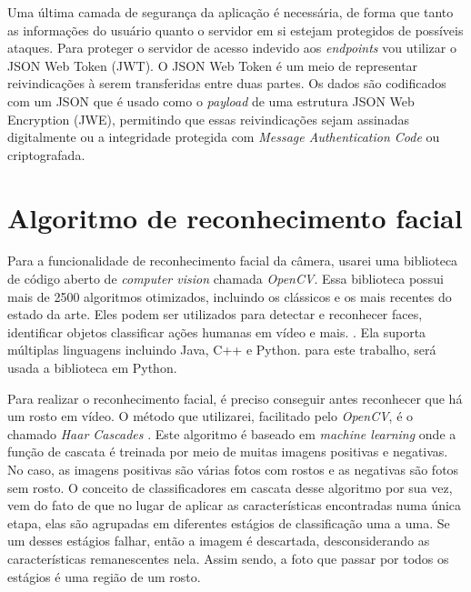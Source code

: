 \documentclass[12pt, %
openright, 
oneside, %
a4paper,    %
brazil]{facom-ufu-abntex2}
\begin{document}
Uma última camada de segurança da aplicação é necessária, de forma que tanto as informações do usuário
quanto o servidor em si estejam protegidos de possíveis ataques. Para proteger o servidor de acesso indevido aos \emph{endpoints}
vou utilizar o JSON Web Token (JWT). O JSON Web Token é um meio de representar reivindicações à serem transferidas entre duas partes.
Os dados são codificados com um JSON que é usado como o \emph{payload} de uma estrutura  JSON Web Encryption (JWE), permitindo que essas
reivindicações sejam assinadas digitalmente ou a integridade protegida com \emph{Message Authentication Code} ou criptografada. \cite{jsonwebtoken}

\section{Algoritmo de reconhecimento facial}

Para a funcionalidade de reconhecimento facial da câmera, usarei uma biblioteca de código aberto
de \emph{computer vision} chamada \emph{OpenCV}. Essa biblioteca possui mais de 2500 algoritmos
otimizados, incluindo os clássicos e os mais recentes do estado da arte. Eles podem ser utilizados
para detectar e reconhecer faces, identificar objetos classificar ações humanas em vídeo e mais. \cite{opencv}.
Ela suporta múltiplas linguagens incluindo Java, C++ e Python. para este trabalho, será usada a biblioteca em Python.

Para realizar o reconhecimento facial, é preciso conseguir antes reconhecer que há um rosto em vídeo.
O método que utilizarei, facilitado pelo \emph{OpenCV}, é o chamado \emph{Haar Cascades} \cite{viola2001rapid}.
Este algoritmo é baseado em \emph{machine learning} onde a função de cascata é treinada por meio de muitas imagens positivas
e negativas. No caso, as imagens positivas são várias fotos com rostos e as negativas são fotos sem rosto. O conceito
de classificadores em cascata desse algoritmo por sua vez, vem do fato de que no lugar de aplicar as características
encontradas numa única etapa, elas são agrupadas em diferentes estágios de classificação uma a uma. Se um desses estágios
falhar, então a imagem é descartada, desconsiderando as características remanescentes nela. Assim sendo, a foto que passar
por todos os estágios é uma região de um rosto.
\end{document}
